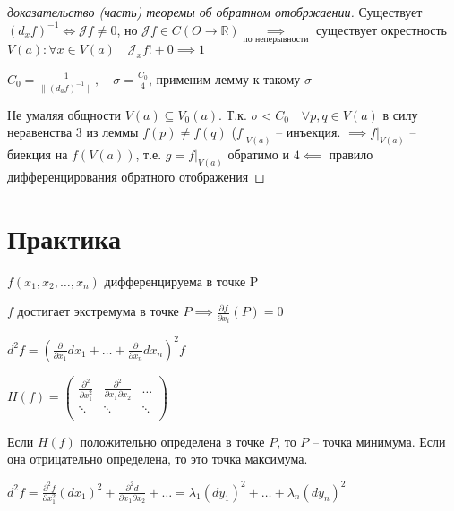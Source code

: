 \documentclass{book}
\newcommand\R{\ensuremath{\mathbb{R}}}
\theoremstyle{definition}
\begin{document}
        \begin{proof}
            [доказательство (часть) теоремы об обратном отобржаении]

            Существует $\left( d_xf \right) ^{-1} \iff  \mathcal{J} f\neq 0$, но $\mathcal{J} f\in C\left( O\to \R \right) \underset{\text{по неперывности}} {\implies}  $ существует окрестность $V(a): \forall x\in V(a)\quad \mathcal{J}_xf !+0 \implies 1$ 

            $C_0 = \frac{1}{\|\left( d_af \right) ^{-1}\|}, \quad \sigma = \frac{C_0}{4}$, применим лемму к такому $\sigma$

            Не умаляя общности  $V(a) \subseteq V_0(a)$. Т.к. $\sigma < C_0\quad \forall p, q\in V(a)$ в силу  неравенства 3 из леммы $f(p)\neq f(q)$ ($f|_{V(a)}$ -- инъекция.  $\implies  f|_{V(a)}$ -- биекция на  $f(V(a))$, т.е.  $g = f|_{V(a)}$ обратимо и  $4 \impliedby $ правило дифференцирования обратного отображения
        \end{proof}
        \section{Практика}
        \begin{theorem}
            $f(x_1, x_2, \ldots, x_{n} )$  дифференцируема в точке P




            $f$ достигает экстремума в точке  $P \implies  \frac{\partial f}{\partial x_i}(P) = 0$
        \end{theorem}
        
            $d^2 f = \left( \frac{\partial}{\partial x_1}dx_1 + \ldots + \frac{\partial}{\partial x_n}dx_{n}  \right)^2 f $

            $H(f)= \begin{pmatrix} 
                \frac{\partial^2}{\partial x_1^2} & \frac{\partial^2}{\partial x_1\partial x_2} & \ldots\\ \ddots & \ddots & \ddots\\
            \end{pmatrix} $
        \begin{theorem}
            Если $H(f)$ положительно определена в точке $P$, то $P$ -- точка минимума. Если она отрицательно определена, то это точка максимума.
        \end{theorem}

        $d^2f = \frac{\partial^2f}{\partial x_1^2}(dx_1)^2 + \frac{\partial^2 d}{\partial x_1\partial x_2} + \ldots = \lambda_1(dy_1)^2 + \ldots + \lambda_n(dy_{n} )^2$
\end{document}
